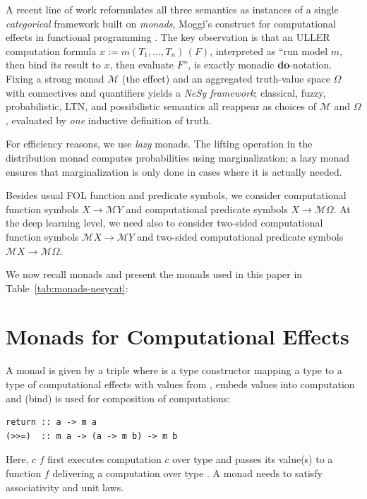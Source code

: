 \documentclass[anon]{../../journal-templates/NeSy26/nesy2026} %
\renewcommand{\ednote}[1]{\textcolor{red}{[#1]}}
\begin{document}
A recent line of work \citep{schellhornNeSyCatCategorical2026} reformulates all three
semantics as instances of a single \emph{categorical} framework built on \emph{monads}, Moggi's
construct for computational effects in functional programming
\citep{moggiNotionsComputation1991}. The key observation is that an ULLER computation formula
$x := m(T_1,\dots,T_n)\,(F)$, interpreted as ``run model $m$, then bind its result to $x$, then evaluate $F$'', is exactly monadic \textbf{do}-notation. Fixing a strong monad $\mathcal M$ (the
effect) and an aggregated truth-value space $\Omega$ with connectives and quantifiers yields a
\emph{NeSy framework}; classical, fuzzy, probabilistic, LTN, and
possibilistic semantics all reappear as choices of $\mathcal M$ and $\Omega$, evaluated by
\emph{one} inductive definition of truth.

For efficiency reasons, we use \emph{lazy} monads. %
The lifting operation in the distribution monad computes probabilities using marginalization; a lazy monad ensures that marginalization is only done in cases where it is actually needed.

Besides usual FOL function and predicate symbols, we consider computational function symbols $X\to \mathcal M Y$ and computational predicate symbols $X\to \mathcal M \Omega$. At the deep learning level, we need also to consider two-sided computational function symbols $\mathcal M X\to \mathcal M Y$ and two-sided computational predicate symbols $\mathcal M X\to \mathcal M \Omega$. 

We now recall monads and present the monads used in this paper in Table~\ref{tab:monads-nesycat}:



\section{Monads for Computational Effects}
\label{sec:monads}

\begin{definition}
A monad is given by a triple  where  is a type constructor mapping a type  to a type  of computational effects with values from ,  embeds values into computation and
\minth{>>=} (bind) is used for composition of computations:
\begin{verbatim}
return :: a -> m a
(>>=)  :: m a -> (a -> m b) -> m b
\end{verbatim}
Here, $c$ \minth{>>=} $f$ first executes computation $c$ over type  and passes its value(s) to a function $f$ delivering a computation over type .
A monad needs to satisfy associativity and unit laws. 
\end{definition}
\end{document}
